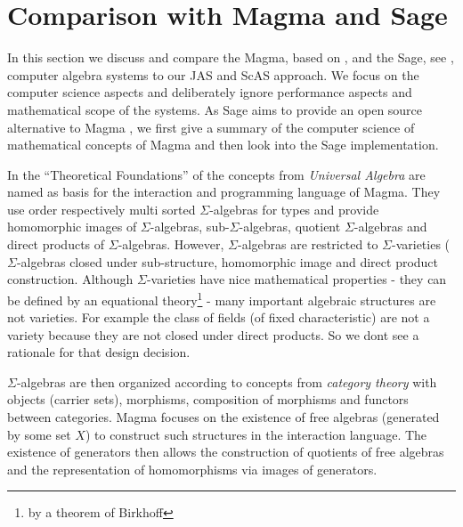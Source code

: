 \documentclass{llncs}
\begin{document}
\section{Comparison with Magma and Sage} %
\label{sec:magma}

In this section we discuss and compare the Magma, based on
\cite{BosmaCannonMatthews:1994,BosmaCannonPlayoust:1997}, and the
Sage, see \cite{Stein:2005,SageWiki:2009}, computer algebra systems to
our JAS and ScAS approach. We focus on the computer science aspects
and deliberately ignore performance aspects and mathematical scope of
the systems.
%
As Sage aims to provide an open source alternative to Magma
\cite{SageWiki:2009}, we first give a summary of the computer science
of mathematical concepts of Magma and then look into the Sage
implementation.

In the ``Theoretical Foundations'' of \cite{BosmaCannonPlayoust:1997}
the concepts from {\em Universal Algebra} are named as basis for the
interaction and programming language of Magma. They use order
respectively multi sorted $\Sigma$-algebras for types and provide
homomorphic images of $\Sigma$-algebras, sub-$\Sigma$-algebras,
quotient $\Sigma$-algebras and direct products of $\Sigma$-algebras.
%
However, $\Sigma$-algebras are restricted to $\Sigma$-varieties
($\Sigma$-algebras closed under sub-structure, homomorphic image and
direct product construction.
Although $\Sigma$-varieties have nice mathematical properties - they
can be defined by an equational theory\footnote{by a
  theorem of Birkhoff} - many important algebraic structures are not
varieties. For example the class of fields (of fixed characteristic)
are not a variety because they are not closed under direct products.
So we dont see a rationale for that design decision.

$\Sigma$-algebras are then organized according to concepts from {\em
  category theory} with objects (carrier sets), morphisms, composition
of morphisms and functors between categories. Magma focuses on the
existence of free algebras (generated by some set $X$) to construct
such structures in the interaction language. The existence of
generators then allows the construction of quotients of free algebras
and the representation of homomorphisms via images of generators.
\end{document}

